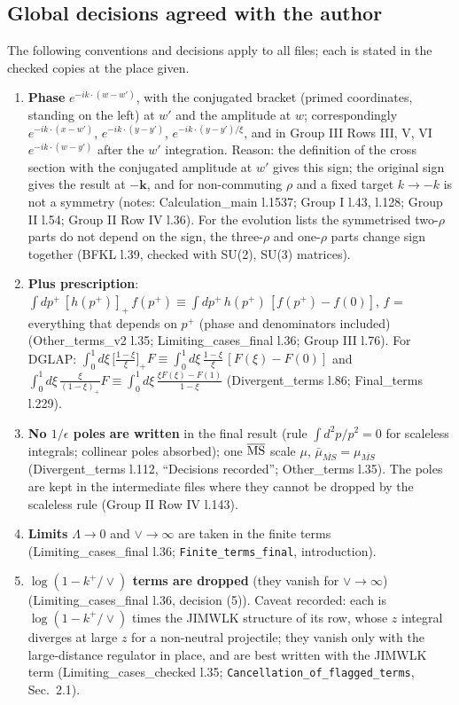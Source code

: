 \documentclass[10pt]{article}
\begin{document}
\subsection{Global decisions agreed with the author}\label{sec:decisions}
\noindent The following conventions and decisions apply to all files; each is stated in the checked copies at the place given.
\begin{enumerate}
\item \textbf{Phase} $e^{-ik\cdot(w-w')}$, with the conjugated bracket (primed coordinates, standing on the left) at $w'$ and the amplitude at $w$; correspondingly $e^{-ik\cdot(x-w')}$, $e^{-ik\cdot(y-y')}$, $e^{-ik\cdot(y-y')/\xi}$, and in Group III Rows III, V, VI $e^{-ik\cdot(w-y')}$ after the $w'$ integration. Reason: the definition of the cross section with the conjugated amplitude at $w'$ gives this sign; the original sign gives the result at $-\mathbf{k}$, and for non-commuting $\rho$ and a fixed target $k\to-k$ is not a symmetry (notes: Calculation\_main l.1537; Group I l.43, l.128; Group II l.54; Group II Row IV l.36). For the evolution lists the symmetrised two-$\rho$ parts do not depend on the sign, the three-$\rho$ and one-$\rho$ parts change sign together (BFKL l.39, checked with SU(2), SU(3) matrices).
\item \textbf{Plus prescription}: $\int dp^{+}\,[h(p^{+})]_{+}\,f(p^{+})\equiv\int dp^{+}\,h(p^{+})\,[f(p^{+})-f(0)]$, $f$ = everything that depends on $p^{+}$ (phase and denominators included) (Other\_terms\_v2 l.35; Limiting\_cases\_final l.36; Group III l.76). For DGLAP: $\int_{0}^{1}d\xi\,\big[\frac{1-\xi}{\xi}\big]_{+}F\equiv\int_{0}^{1}d\xi\,\frac{1-\xi}{\xi}\,[F(\xi)-F(0)]$ and $\int_{0}^{1}d\xi\,\frac{\xi}{(1-\xi)_{+}}F\equiv\int_{0}^{1}d\xi\,\frac{\xi F(\xi)-F(1)}{1-\xi}$ (Divergent\_terms l.86; Final\_terms l.229).
\item \textbf{No $1/\epsilon$ poles are written} in the final result (rule $\int d^{2}p/p^{2}=0$ for scaleless integrals; collinear poles absorbed); one $\overline{\rm MS}$ scale $\mu$, $\bar\mu_{\overline{MS}}=\mu_{\overline{MS}}$ (Divergent\_terms l.112, ``Decisions recorded''; Other\_terms l.35). The poles are kept in the intermediate files where they cannot be dropped by the scaleless rule (Group II Row IV l.143).
\item \textbf{Limits} $\Lambda\to0$ and $\vee\to\infty$ are taken in the finite terms (Limiting\_cases\_final l.36; \texttt{Finite\_terms\_final}, introduction).
\item \textbf{$\log(1-k^{+}/\vee)$ terms are dropped} (they vanish for $\vee\to\infty$) (Limiting\_cases\_final l.36, decision (5)). Caveat recorded: each is $\log(1-k^{+}/\vee)$ times the JIMWLK structure of its row, whose $z$ integral diverges at large $z$ for a non-neutral projectile; they vanish only with the large-distance regulator in place, and are best written with the JIMWLK term (Limiting\_cases\_checked l.35; \texttt{Cancellation\_of\_flagged\_terms}, Sec.~2.1).

\end{enumerate}
\end{document}
